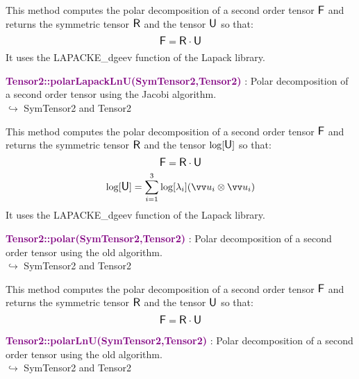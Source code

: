 This method computes the polar decomposition of a second order tensor $\mbox{\large\ensuremath{\mathsf{F}}}$ and returns the symmetric tensor $\mbox{\large\ensuremath{\mathsf{R}}}$ and the tensor $\mbox{\large\ensuremath{\mathsf{U}}}$ so that:
\begin{equation*}
\mbox{\large\ensuremath{\mathsf{F}}} = \mbox{\large\ensuremath{\mathsf{R}}} \cdot \mbox{\large\ensuremath{\mathsf{U}}}
\end{equation*}
It uses the LAPACKE\_dgeev function of the Lapack library.

\textcolor{purple}{\textbf{Tensor2::polarLapackLnU(SymTensor2,Tensor2)}}\label{Tensor2::polarLapackLnU(SymTensor2,Tensor2)} : Polar decomposition of a second order tensor using the Jacobi algorithm.\\ \hspace*{5mm}$\hookrightarrow$ SymTensor2 and Tensor2

This method computes the polar decomposition of a second order tensor $\mbox{\large\ensuremath{\mathsf{F}}}$ and returns the symmetric tensor $\mbox{\large\ensuremath{\mathsf{R}}}$ and the tensor $\log[\mbox{\large\ensuremath{\mathsf{U}}}]$ so that:
\begin{equation*}
\mbox{\large\ensuremath{\mathsf{F}}} = \mbox{\large\ensuremath{\mathsf{R}}} \cdot \mbox{\large\ensuremath{\mathsf{U}}}
\end{equation*}
\begin{equation*}
\log [\U] =\sum _{i=1}^{3}\log[\lambda_{i}](\overrightarrow{u}_{i}\otimes \overrightarrow{u}_{i})
\end{equation*}
It uses the LAPACKE\_dgeev function of the Lapack library.

\textcolor{purple}{\textbf{Tensor2::polar(SymTensor2,Tensor2)}}\label{Tensor2::polar(SymTensor2,Tensor2)} : Polar decomposition of a second order tensor using the old \DynELA algorithm.\\ \hspace*{5mm}$\hookrightarrow$ SymTensor2 and Tensor2

This method computes the polar decomposition of a second order tensor $\mbox{\large\ensuremath{\mathsf{F}}}$ and returns the symmetric tensor $\mbox{\large\ensuremath{\mathsf{R}}}$ and the tensor $\mbox{\large\ensuremath{\mathsf{U}}}$ so that:
\begin{equation*}
\mbox{\large\ensuremath{\mathsf{F}}} = \mbox{\large\ensuremath{\mathsf{R}}} \cdot \mbox{\large\ensuremath{\mathsf{U}}}
\end{equation*}

\textcolor{purple}{\textbf{Tensor2::polarLnU(SymTensor2,Tensor2)}}\label{Tensor2::polarLnU(SymTensor2,Tensor2)} : Polar decomposition of a second order tensor using the old \DynELA algorithm.\\ \hspace*{5mm}$\hookrightarrow$ SymTensor2 and Tensor2

